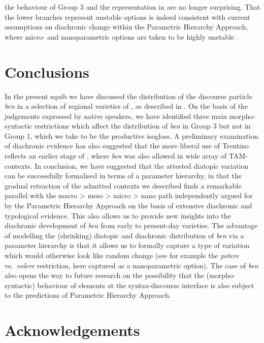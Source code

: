\documentclass[output=paper]{langsci/langscibook}
\begin{document}
the behaviour of Group 3 and the representation in  are no longer
surprising. That the lower branches represent unstable options is indeed
consistent with current assumptions on diachronic change within the Parametric
Hierarchy Approach, where micro- and nanoparametric options are taken to be
highly unstable \parencite[261]{BibRob2016}.

\section{Conclusions}\label{sec:23-conclusions}

In the present squib we have discussed the distribution of the discourse
particle \emph{ben} in a selection of regional varieties of , as
described in \textcite{CognSchi2015,CognSchi2018b,CognSchi2018}. On the basis
of the judgements expressed by native speakers, we have identified three main
morpho-syntactic restrictions which affect the distribution of \emph{ben} in
Group 3 but not in Group 1, which we take to be the productive isogloss. A
preliminary examination of diachronic evidence has also suggested that the more
liberal use of Trentino reflects an earlier stage of , where
\emph{ben} was also allowed in wide array of TAM-contexts. In conclusion, we
have suggested that the attested diatopic variation can be successfully
formalised in terms of a parameter hierarchy, in that the gradual retraction of
the admitted contexts we described finds a remarkable parallel with the macro >
meso > micro > nano path independently argued for by the Parametric Hierarchy
Approach on the basis of extensive diachronic and typological evidence. This
also allows us to provide new insights into the diachronic development of
\emph{ben} from early  to present-day varieties. The advantage of
modelling the (shrinking) diatopic and diachronic distribution of \emph{ben}
via a parameter hierarchy is that it allows us to formally capture a type of
variation which would otherwise look like random change (see for example the
\emph{potere} vs.\ \emph{volere} restriction, here captured as a nanoparametric
option). The case of  \emph{ben} also opens the way to future research
on the possibility that the (morpho-syntactic) behaviour of elements at the
syntax-discourse interface is also subject to the predictions of Parametric
Hierarchy Approach.

\printchapterglossary{}

\section*{Acknowledgements}
\end{document}
